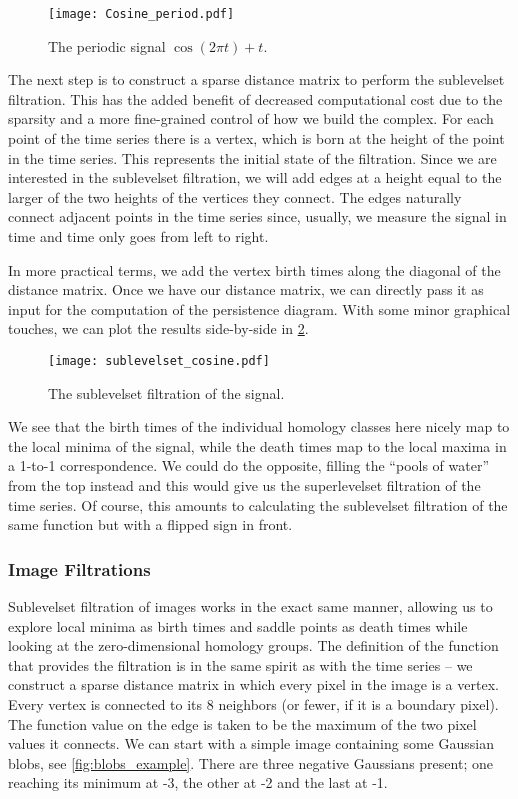 \begin{figure}[h!]
  \centering
  \texttt{[image: Cosine\_period.pdf]}
  \caption{The periodic signal $\cos(2\pi t) + t$.}
  \label{fig:cosine_period}
\end{figure}

The next step is to construct a sparse distance matrix to perform the sublevelset filtration. This has the added benefit of decreased computational cost due to the sparsity and a more fine-grained control of how we build the complex. For each point of the time series there is a vertex, which is born at the height of the point in the time series. This represents the initial state of the filtration. Since we are interested in the sublevelset filtration, we will add edges at a height equal to the larger of the two heights of the vertices they connect. The edges naturally connect adjacent points in the time series since, usually, we measure the signal in time and time only goes from left to right.

In more practical terms, we add the vertex birth times along the diagonal of the distance matrix. Once we have our distance matrix, we can directly pass it as input for the computation of the persistence diagram. With some minor graphical touches, we can plot the results side-by-side in \ref{fig:cosine_filtration}.

\begin{figure}[h!]
  \centering
  \texttt{[image: sublevelset\_cosine.pdf]}
  \caption{The sublevelset filtration of the signal.}
  \label{fig:cosine_filtration}
\end{figure}

We see that the birth times of the individual homology classes here nicely map to the local minima of the signal, while the death times map to the local maxima in a 1-to-1 correspondence. We could do the opposite, filling the ``pools of water'' from the top instead and this would give us the superlevelset filtration of the time series. Of course, this amounts to calculating the sublevelset filtration of the same function but with a flipped sign in front.

\subsubsection{Image Filtrations}

Sublevelset filtration of images works in the exact same manner, allowing us to explore local minima as birth times and saddle points as death times while looking at the zero-dimensional homology groups. The definition of the function that provides the filtration is in the same spirit as with the time series -- we construct a sparse distance matrix in which every pixel in the image is a vertex. Every vertex is connected to its 8 neighbors (or fewer, if it is a boundary pixel). The function value on the edge is taken to be the maximum of the two pixel values it connects. We can start with a simple image containing some Gaussian blobs, see \ref{fig:blobs_example}. There are three negative Gaussians present; one reaching its minimum at -3, the other at -2 and the last at -1.

